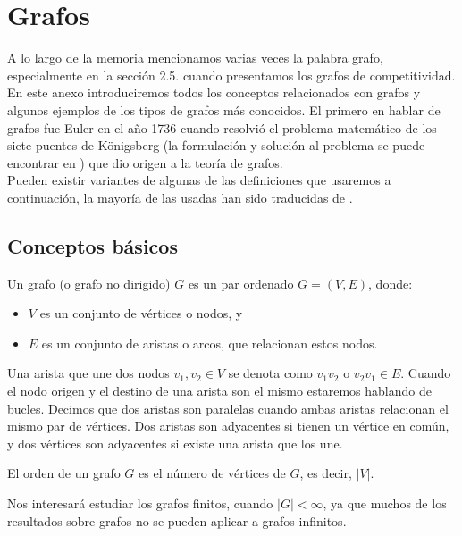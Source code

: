 \chapter{Grafos}

A lo largo de la memoria mencionamos varias veces la palabra grafo, especialmente en la sección 2.5. cuando presentamos los grafos de competitividad. En este anexo introduciremos todos los conceptos relacionados con grafos y algunos ejemplos de los tipos de grafos más conocidos. El primero en hablar de grafos fue Euler en el año 1736 cuando resolvió el problema matemático de los siete puentes de Königsberg (la formulación y solución al problema se puede encontrar en \cite{refpuentes}) que dio origen a la teoría de grafos.\\

Pueden existir variantes de algunas de las definiciones que usaremos a continuación, la mayoría de las usadas han sido traducidas de \cite{librografos}.

\section{Conceptos básicos}

\begin{defi} 
	Un grafo (o grafo no dirigido) $G$ es un par ordenado $G=(V,E)$, donde:
	\begin{itemize}
		\item $V$ es un conjunto de vértices o nodos, y
		\item $E$ es un conjunto de aristas o arcos, que relacionan estos nodos.
	\end{itemize}
\end{defi}

Una arista que une dos nodos $v_{1},v_{2} \in V$ se denota como $v_{1}v_{2}$ o $v_{2}v_{1} \in E$. Cuando el nodo origen y el destino de una arista son el mismo estaremos hablando de bucles. Decimos que dos aristas son paralelas cuando ambas aristas relacionan el mismo par de vértices. Dos aristas son adyacentes si tienen un vértice en común, y dos vértices son adyacentes si existe una arista que los une.

\begin{defi} 
	El orden de un grafo $G$ es el número de vértices de $G$, es decir, $|V|$.
\end{defi}

Nos interesará estudiar los grafos finitos, cuando $|G|< \infty$, ya que muchos de los resultados sobre grafos no se pueden aplicar a grafos infinitos.

